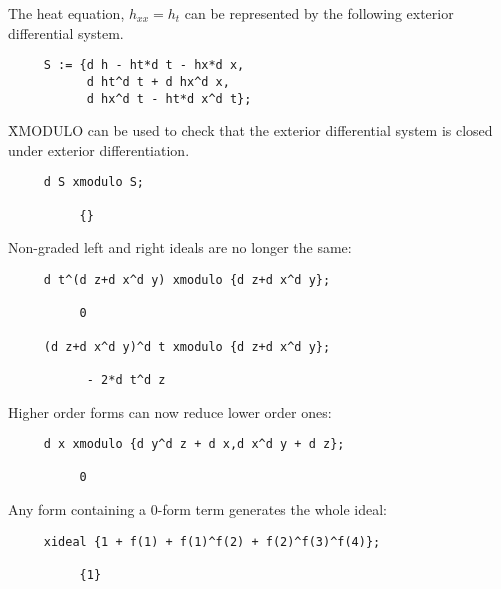 The heat equation, $h_{xx}=h_t$ can be represented by the following
exterior differential system. 
\begin{verbatim}
     S := {d h - ht*d t - hx*d x,
           d ht^d t + d hx^d x,
           d hx^d t - ht*d x^d t};
\end{verbatim}
\f{XMODULO} can be used to check that the exterior differential system is
closed under exterior differentiation.
\begin{verbatim}
     d S xmodulo S;

          {}
\end{verbatim}

Non-graded left and right ideals are no longer the same:
\begin{verbatim}
     d t^(d z+d x^d y) xmodulo {d z+d x^d y};

          0

     (d z+d x^d y)^d t xmodulo {d z+d x^d y};

           - 2*d t^d z
\end{verbatim}
Higher order forms can now reduce lower order ones:
\begin{verbatim}
     d x xmodulo {d y^d z + d x,d x^d y + d z};

          0
\end{verbatim}
Any form containing a 0-form term generates the whole ideal:
\begin{verbatim}
     xideal {1 + f(1) + f(1)^f(2) + f(2)^f(3)^f(4)};

          {1}
\end{verbatim}

